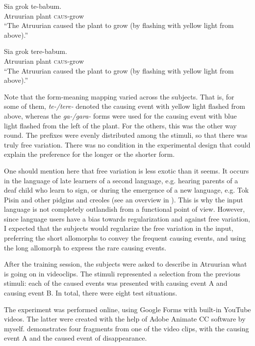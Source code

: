 \documentclass[output=paper]{langsci/langscibook}
\begin{document}
\ea
\ea
\gll  Sia    grok  te-babum.\\
       Atruurian   plant   \textsc{caus}{}-grow\\
\glt “The Atruurian caused the plant to grow (by flashing with yellow light from above).”

\ex
\gll  Sia    grok  tere-babum.\\
       Atruurian   plant   \textsc{caus}{}-grow\\
\glt “The Atruurian caused the plant to grow (by flashing with yellow light from above).”
\z
\z

Note that the form-meaning mapping varied across the subjects. That is, for some of them, \textit{te-/tere-} denoted the causing event with yellow light flashed from above, whereas the \textit{ga-/gara-} forms were used for the causing event with blue light flashed from the left of the plant. For the others, this was the other way round. The prefixes were evenly distributed among the stimuli, so that there was truly free variation. There was no condition in the experimental design that could explain the preference for the longer or the shorter form.  

One should mention here that free variation is less exotic than it seems. It occurs in the language of late learners of a second language, e.g. hearing parents of a deaf child who learn to sign, or during the emergence of a new language, e.g. Tok Pisin and other pidgins and creoles (see an overview in \citealt{HudsonKamNewport2009}). This is why the input language is not completely outlandish from a functional point of view. However, since language users have a bias towards regularization and against free variation, I expected that the subjects would regularize the free variation in the input, preferring the short allomorphs to convey the frequent causing events, and using the long allomorph to express the rare causing events.

After the training session, the subjects were asked to describe in Atruurian what is going on in videoclips. The stimuli represented a selection from the previous stimuli: each of the caused events was presented with causing event A and causing event B. In total, there were eight test situations. 

The experiment was performed online, using Google Forms with built-in YouTube videos. The latter were created with the help of Adobe Animate CC software by myself.  demonstrates four fragments from one of the video clips, with the causing event A and the caused event of disappearance.
\end{document}
